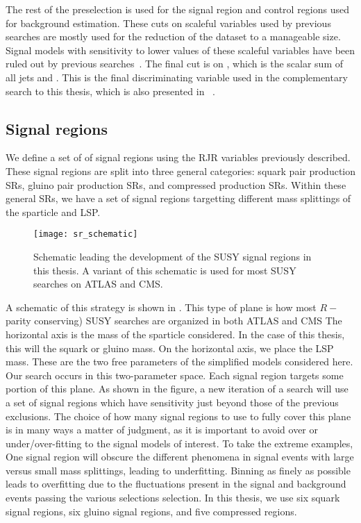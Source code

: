 The rest of the preselection is used for the signal region and control regions used for background estimation.
These cuts on scaleful variables used by previous searches are mostly used for the reduction of the dataset to a manageable size.
Signal models with sensitivity to lower values of these scaleful variables have been ruled out by previous searches~\cite{SUSY-2015-06}.
The final cut is on \meff, which is the scalar sum of all jets and \met.
This is the final discriminating variable used in the complementary search to this thesis, which is also presented in ~\cite{ATLAS-CONF-2016-078}.



\subsection{Signal regions}
We define a set of of signal regions using the RJR variables previously described.
These signal regions are split into three general categories: squark pair production SRs, gluino pair production SRs, and compressed production SRs.
Within these general SRs, we have a set of signal regions targetting different mass splittings of the sparticle and LSP.
\begin{figure}
\caption{Schematic leading the development of the SUSY signal regions in this thesis.
A variant of this schematic is used for most SUSY searches on ATLAS and CMS.
} \label{fig:sr_schematic}
\texttt{[image: sr\_schematic]}
\end{figure}

A schematic of this strategy is shown in .
This type of plane is how most $R-$parity conserving) SUSY searches are organized in both ATLAS and CMS
The horizontal axis is the mass of the sparticle considered.
In the case of this thesis, this will the squark or gluino mass.
On the horizontal axis, we place the LSP mass.
These are the two free parameters of the simplified models considered here.
Our search occurs in this two-parameter space.
Each signal region targets some portion of this plane.
As shown in the figure, a new iteration of a search will use a set of signal regions which have sensitivity just beyond those of the previous exclusions.
The choice of how many signal regions to use to fully cover this plane is in many ways a matter of judgment, as it is important to avoid over or under/over-fitting to the signal models of interest.
To take the extreme examples, One signal region will obscure the different phenomena in signal events with large versus small mass splittings, leading to underfitting.
Binning as finely as possible\footnotemark~ leads to overfitting due to the fluctuations present in the signal and background events passing the various selections selection.
In this thesis, we use six squark signal regions, six gluino signal regions, and five compressed regions.

